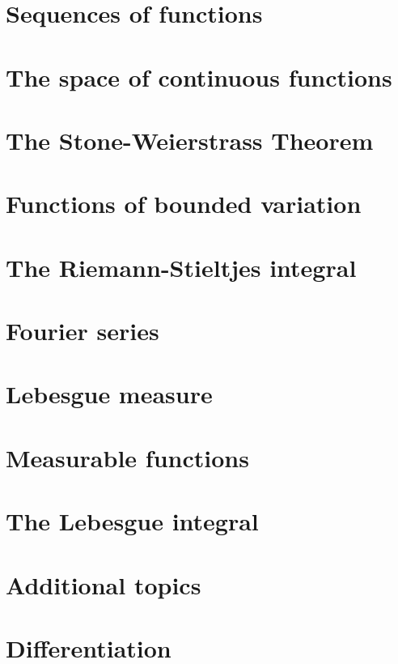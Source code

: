 \documentclass{bookSolutions}
\begin{document}
\section{Sequences of functions}

\section{The space of continuous functions}

\section{The Stone-Weierstrass Theorem}

\section{Functions of bounded variation}

\section{The Riemann-Stieltjes integral}

\section{Fourier series}

\section{Lebesgue measure}

\section{Measurable functions}

\section{The Lebesgue integral}

\section{Additional topics}

\section{Differentiation}
\end{document}
